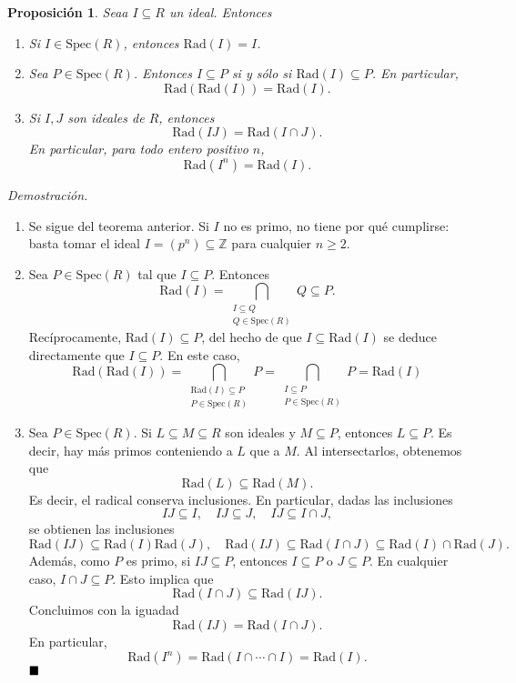 \documentclass[11pt]{book}
\def\Z{\mathbb{Z}}
\def\Spec{\mathrm{Spec}}
\def\Rad{\mathrm{Rad}}
\def\qed{\hfill\blacksquare}
\newtheorem{prop}[theorem]{Proposición}
\theoremstyle{definition}
\begin{document}
\begin{prop}
    Seaa $I\subseteq R$ un ideal. Entonces\begin{enumerate}
        \item Si $I\in\Spec(R)$, entonces $\Rad(I)=I$.
        \item Sea $P\in\Spec(R)$. Entonces $I\subseteq P$ si y sólo si $\Rad(I)\subseteq P$. En particular,\[
        \Rad(\Rad(I))=\Rad(I).
        \]
        \item Si $I,J$ son ideales de $R$, entonces\[
        \Rad(IJ)=\Rad(I\cap J).
        \]En particular, para todo entero positivo $n$,\[
        \Rad(I^n)=\Rad(I).
        \]
    \end{enumerate}
\end{prop}
\noindent\textit{Demostración.}\begin{enumerate}
    \item Se sigue del teorema anterior. Si $I$ no es primo, no tiene por qué cumplirse: basta tomar el ideal $I=(p^n)\subseteq\Z$ para cualquier $n\geq 2$.
    \item Sea $P\in\Spec(R)$ tal que $I\subseteq P$. Entonces\[
    \Rad(I)=\bigcap_{\substack{
        I\subseteq Q\\ Q\in\Spec(R)}}Q\subseteq P.
    \]Recíprocamente, $\Rad(I)\subseteq P$, del hecho de que $I\subseteq\Rad(I)$ se deduce directamente que $I\subseteq P$. En este caso,\[
    \Rad(\Rad(I))=\bigcap_{\substack{\Rad(I)\subseteq P\\ P\in\Spec(R)}}P=\bigcap_{\substack{I\subseteq P\\ P\in\Spec(R)}}P=\Rad(I)
    \]
    \item Sea $P\in \Spec(R)$. Si $L\subseteq M\subseteq R$ son ideales y $M\subseteq P$, entonces $L\subseteq P$. Es decir, hay más primos conteniendo a $L$ que a $M$. Al intersectarlos, obtenemos que\[
    \Rad(L)\subseteq \Rad(M).
    \]Es decir, el radical conserva inclusiones. En particular, dadas las inclusiones\[
    IJ\subseteq I,\quad IJ\subseteq J,\quad IJ\subseteq I\cap J,
    \]se obtienen las inclusiones\[
    \Rad(IJ)\subseteq\Rad(I)\Rad(J),\quad \Rad(IJ)\subseteq \Rad(I\cap J)\subseteq \Rad(I)\cap \Rad(J).
    \]Además, como $P$ es primo, si $IJ\subseteq P$, entonces $I\subseteq P$ o $J\subseteq P$. En cualquier caso, $I\cap J\subseteq P$. Esto implica que\[
    \Rad(I\cap J)\subseteq \Rad(IJ).
    \]Concluimos con la iguadad\[
    \Rad(IJ)=\Rad(I\cap J).
    \]En particular,\[
    \Rad(I^n)=\Rad(I\cap\cdots\cap I)=\Rad(I).
    \]$\qed$
\end{enumerate}
\end{document}
